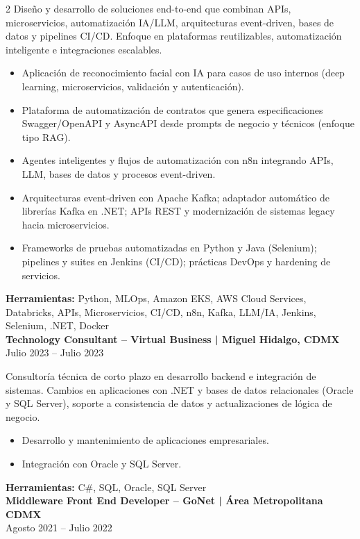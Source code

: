 \documentclass[11pt,a4paper]{article}
\begin{document}
\begin{paracol}{2}
Diseño y desarrollo de soluciones end-to-end que combinan APIs, microservicios, automatización IA/LLM, arquitecturas event-driven, bases de datos y pipelines CI/CD. Enfoque en plataformas reutilizables, automatización inteligente e integraciones escalables.
\begin{itemize}[leftmargin=*, nosep, topsep=2pt]
  \item Aplicación de reconocimiento facial con IA para casos de uso internos (deep learning, microservicios, validación y autenticación).
  \item Plataforma de automatización de contratos que genera especificaciones Swagger/OpenAPI y AsyncAPI desde prompts de negocio y técnicos (enfoque tipo RAG).
  \item Agentes inteligentes y flujos de automatización con n8n integrando APIs, LLM, bases de datos y procesos event-driven.
  \item Arquitecturas event-driven con Apache Kafka; adaptador automático de librerías Kafka en .NET; APIs REST y modernización de sistemas legacy hacia microservicios.
  \item Frameworks de pruebas automatizadas en Python y Java (Selenium); pipelines y suites en Jenkins (CI/CD); prácticas DevOps y hardening de servicios.
\end{itemize}
\textbf{\textcolor{softtekOrange}{Herramientas:}} Python, MLOps, Amazon EKS, AWS Cloud Services, Databricks, APIs, Microservicios, CI/CD, n8n, Kafka, LLM/IA, Jenkins, Selenium, .NET, Docker\\[0.8em]

\textcolor{softtekAccent}{\textbf{Technology Consultant -- Virtual Business | Miguel Hidalgo, CDMX}}\\
Julio 2023 -- Julio 2023

Consultoría técnica de corto plazo en desarrollo backend e integración de sistemas. Cambios en aplicaciones con .NET y bases de datos relacionales (Oracle y SQL Server), soporte a consistencia de datos y actualizaciones de lógica de negocio.
\begin{itemize}[leftmargin=*, nosep, topsep=2pt]
  \item Desarrollo y mantenimiento de aplicaciones empresariales.
  \item Integración con Oracle y SQL Server.
\end{itemize}
\textbf{\textcolor{softtekOrange}{Herramientas:}} C\#, SQL, Oracle, SQL Server\\[0.8em]

\textcolor{softtekAccent}{\textbf{Middleware Front End Developer -- GoNet | Área Metropolitana CDMX}}\\
Agosto 2021 -- Julio 2022


\end{paracol}
\end{document}
